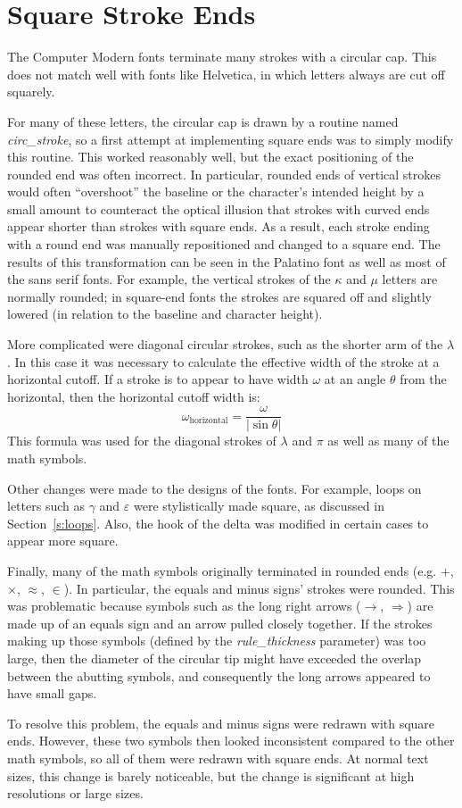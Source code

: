 \section{Square Stroke Ends}\label{s:squareends}

The Computer Modern fonts terminate many strokes with a circular cap. This does
not match well with fonts like Helvetica, in which letters always are cut off
squarely.

For many of these letters, the circular cap is drawn by a routine named
\emph{circ\_stroke}, so a first attempt at implementing square ends was to
simply modify this routine. This worked reasonably well, but the exact
positioning of the rounded end was often incorrect. In particular, rounded ends
of vertical strokes would often ``overshoot'' the baseline or the character's
intended height by a small amount to counteract the optical illusion that
strokes with curved ends appear shorter than strokes with square ends. As a
result, each stroke ending with a round end was manually repositioned and
changed to a square end. The results of this transformation can be seen in the
Palatino font as well as most of the sans serif fonts. For example, the vertical
strokes of the $\kappa$ and $\mu$ letters are normally rounded; in square-end
fonts the strokes are squared off and slightly lowered (in relation to the
baseline and character height).

More complicated were diagonal circular strokes, such as the shorter arm of the
$\lambda$. In this case it was necessary to calculate the effective width of the
stroke at a horizontal cutoff. If a stroke is to appear to have width $\omega$
at an angle $\theta$ from the horizontal, then the horizontal cutoff width is:
\[
\omega_{\mathrm{horizontal}} = \frac{\omega}{|\sin\theta|}
\]
This formula was used for the diagonal strokes of $\lambda$ and $\pi$ as well as
many of the math symbols.

Other changes were made to the designs of the fonts. For example, loops on
letters such as $\gamma$ and $\varepsilon$ were stylistically made square, as
discussed in Section~\ref{s:loops}. Also, the hook of the delta was modified in
certain cases to appear more square.

Finally, many of the math symbols originally terminated in rounded ends (e.g.
$+$, $\times$, $\approx$, $\in$). In particular, the equals and minus signs'
strokes were rounded. This was problematic because symbols such as the long
right arrows ($\longrightarrow$, $\Longrightarrow$) are made up of an equals
sign and an arrow pulled closely together. If the strokes making up those
symbols (defined by the \emph{rule\_thickness} parameter) was too large, then
the diameter of the circular tip might have exceeded the overlap between the
abutting symbols, and consequently the long arrows appeared to have small gaps.

To resolve this problem, the equals and minus signs were redrawn with square
ends. However, these two symbols then looked inconsistent compared to the other
math symbols, so all of them were redrawn with square ends. At normal text
sizes, this change is barely noticeable, but the change is significant at high
resolutions or large sizes.
